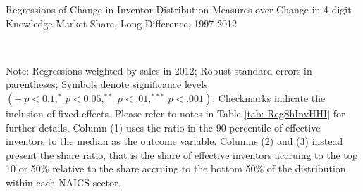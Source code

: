\begin{sidewaystable}[ph]
\caption{Regressions of Change in Inventor Distribution Measures over Change
in 4-digit Knowledge Market Share, Long-Difference, 1997-2012\label{tab: RegStats}}

\begin{centering}
\scalebox{1}{}\\
\par\end{centering}
\raggedright{}{\small{}Note: Regressions weighted by sales in 2012;
Robust standard errors in parentheses; Symbols denote significance
levels $\left(+\ p<0.1,^{*}\ p<0.05,^{**}\ p<.01,^{***}\ p<.001\right)$;
Checkmarks indicate the inclusion of fixed effects. Please refer to
notes in Table \ref{tab: RegShInvHHI} for further details. Column
(1) uses the ratio in the 90 percentile of effective inventors to
the median as the outcome variable. Columns (2) and (3) instead present
the share ratio, that is the share of effective inventors accruing
to the top 10 or 50\% relative to the share accruing to the bottom
50\% of the distribution within each NAICS sector.}{\small\par}
\end{sidewaystable}

